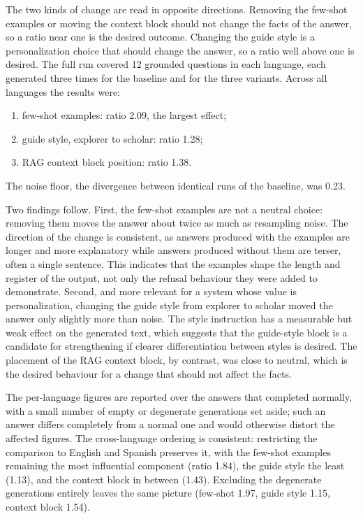 The two kinds of change are read in opposite directions. Removing the few-shot examples or moving the context block should not change the facts of the answer, so a ratio near one is the desired outcome. Changing the guide style is a personalization choice that should change the answer, so a ratio well above one is desired. The full run covered 12 grounded questions in each language, each generated three times for the baseline and for the three variants. Across all languages the results were:
\begin{enumerate}
    \item few-shot examples: ratio 2.09, the largest effect;
    \item guide style, explorer to scholar: ratio 1.28;
    \item RAG context block position: ratio 1.38.
\end{enumerate}
The noise floor, the divergence between identical runs of the baseline, was 0.23.

Two findings follow. First, the few-shot examples are not a neutral choice: removing them moves the answer about twice as much as resampling noise. The direction of the change is consistent, as answers produced with the examples are longer and more explanatory while answers produced without them are terser, often a single sentence. This indicates that the examples shape the length and register of the output, not only the refusal behaviour they were added to demonstrate. Second, and more relevant for a system whose value is personalization, changing the guide style from explorer to scholar moved the answer only slightly more than noise. The style instruction has a measurable but weak effect on the generated text, which suggests that the guide-style block is a candidate for strengthening if clearer differentiation between styles is desired. The placement of the RAG context block, by contrast, was close to neutral, which is the desired behaviour for a change that should not affect the facts.

The per-language figures are reported over the answers that completed normally, with a small number of empty or degenerate generations set aside; such an answer differs completely from a normal one and would otherwise distort the affected figures. The cross-language ordering is consistent: restricting the comparison to English and Spanish preserves it, with the few-shot examples remaining the most influential component (ratio 1.84), the guide style the least (1.13), and the context block in between (1.43). Excluding the degenerate generations entirely leaves the same picture (few-shot 1.97, guide style 1.15, context block 1.54).


